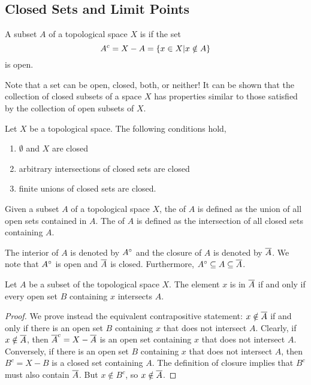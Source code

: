 \subsection{Closed Sets and Limit Points}

\begin{definition}
A subset $A$ of a topological space $X$ is  if the set
\begin{equation*}
{A}^{c} = X - A = \{ x \in X | x \notin A \}
\end{equation*}
is open.
\end{definition}

Note that a set can be open, closed, both, or neither!
It can be shown that the collection of closed subsets of a space $X$ has properties similar to those satisfied by the collection of open subsets of $X$.

\begin{fact}
Let $X$ be a topological space.
The following conditions hold,
\begin{enumerate}
\item $\emptyset$ and $X$ are closed
\item arbitrary intersections of closed sets are closed
\item finite unions of closed sets are closed.
\end{enumerate}
\end{fact}

\begin{definition}
Given a subset $A$ of a topological space $X$, the  of $A$ is defined as the union of all open sets contained in $A$.
The  of $A$ is defined as the intersection of all closed sets containing $A$.
\end{definition}

The interior of $A$ is denoted by ${A}^{\circ}$ and the closure of $A$ is denoted by $\overline{A}$.
We note that ${A}^{\circ}$ is open and $\overline{A}$ is closed.
Furthermore, ${A}^{\circ} \subseteq A \subseteq \overline{A}$.

\begin{theorem} \label{theorem:ClosureConditions}
Let $A$ be a subset of the topological space $X$.
The element $x$ is in $\overline{A}$ if and only if every open set $B$ containing $x$ intersects $A$.
\end{theorem}
\begin{proof}
We prove instead the equivalent contrapositive statement: $x \notin \overline{A}$ if and only if there is an open set $B$ containing $x$ that does not intersect $A$.
Clearly, if  $x \notin \overline{A}$, then $\overline{A}^c = X - \overline{A}$ is an open set containing $x$ that does not intersect $A$.
Conversely, if there is an open set $B$ containing $x$ that does not intersect $A$, then $B^c = X-B$ is a closed set containing $A$.
The definition of closure implies that $B^c$ must also contain $\overline{A}$.
But $x \notin B^c$, so $x\notin \overline{A}$.
\end{proof}

